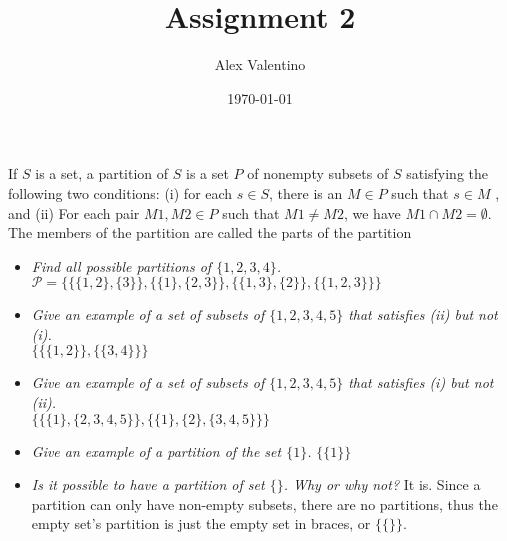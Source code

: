 \documentclass[12pt, letterpaper]{article}
\date{\today}
\author{Alex Valentino}
\title{Assignment 2}
\newcommand{\Po}{\mathcal{P}}
\begin{document}
	If $S$ is a set, a partition of $S$ is a set $P$ of nonempty subsets of $S$ satisfying the following two
conditions: (i) for each $s \in S$, there is an $M \in P$ such that $s \in M$ , and (ii) For each pair
$M1, M2 \in P$ such that $M1 \neq M2$, we have $M1 \cap M2 = \emptyset$. The members of the partition are
called the parts of the partition
	\begin{itemize}
		\item \textit{Find all possible partitions of $\{1, 2, 3, 4\}$.}\\
		$\Po = \{\{\{1,2\},\{3\}\},\{\{1\},\{2,3\}\},\{\{1,3\},\{2\}\},\{\{1,2,3\}\}\}$
		\item \textit{Give an example of a set of subsets of $\{1, 2, 3, 4, 5\}$ that satisfies (ii) but not (i).}\\
		$\{\{\{1,2\}\},\{\{3,4\}\}\}$
		\item \textit{Give an example of a set of subsets of $\{1, 2, 3, 4, 5\}$ that satisfies (i) but not (ii).}\\
		$\{\{\{1\},\{2,3,4,5\}\},\{\{1\},\{2\},\{3,4,5\}\}\}$
		\item \textit{Give an example of a partition of the set $\{1\}$.}
		$\{\{1\}\}$
		\item \textit{Is it possible to have a partition of set $\{\}$. Why or why not?}
		It is.  Since a partition can only have non-empty subsets, there are no partitions, thus the empty set's partition is just the empty set in braces, or $\{\{\}\}$.  
		
	\end{itemize}
\end{document}
